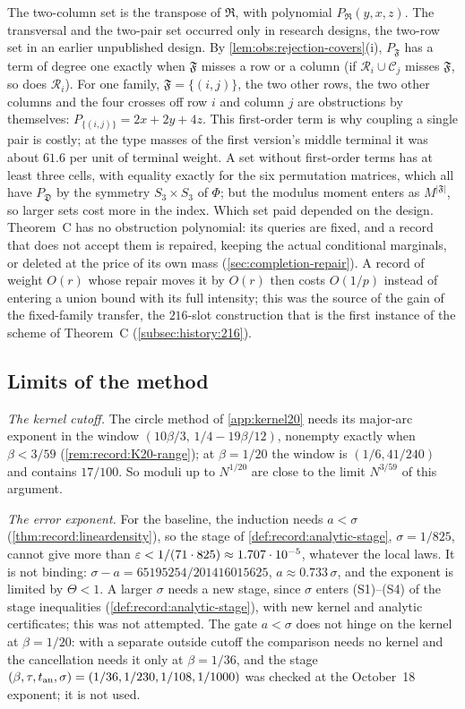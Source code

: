 The two-column set is the transpose of $\mathfrak R$, with polynomial
$P_{\mathfrak R}(y,x,z)$. The transversal and the two-pair set occurred only in
research designs, the two-row set in an earlier unpublished design. By
\cref{lem:obs:rejection-covers}(i), $P_{\mathfrak F}$ has a term of degree one
exactly when $\mathfrak F$ misses a row or a column (if
$\mathcal R_i\cup\mathcal C_j$ misses $\mathfrak F$, so does $\mathcal R_i$). For
one family, $\mathfrak F=\{(i,j)\}$, the two other rows, the two other columns
and the four crosses off row $i$ and column $j$ are obstructions by themselves:
$P_{\{(i,j)\}}=2x+2y+4z$. This first-order term is why coupling a single pair is
costly; at the type masses of the first version's middle terminal it was about
$61.6$ per unit of terminal weight. A set without first-order terms has at least
three cells, with equality exactly for the six permutation matrices, which all
have $P_{\mathfrak D}$ by the symmetry $S_3\times S_3$ of $\Phi$; but the
modulus moment enters as $M^{|\mathfrak F|}$, so larger sets cost more in the
index. Which set paid depended on the design. Theorem~C has no obstruction
polynomial: its queries are fixed, and a record that does not accept them is
repaired, keeping the actual conditional marginals, or deleted at the price of
its own mass (\cref{sec:completion-repair}). A record of weight $O(r)$ whose
repair moves it by $O(r)$ then costs $O(1/p)$ instead of entering a union bound
with its full intensity; this was the source of the gain of the fixed-family
transfer, the $216$-slot construction that is the first instance of the scheme
of Theorem~C (\cref{subsec:history:216}).

\subsection{Limits of the method}\label{subsec:obs:limits}

\emph{The kernel cutoff.} The circle method of \cref{app:kernel20} needs its
major-arc exponent in the window $(10\beta/3,\,1/4-19\beta/12)$, nonempty exactly
when $\beta<3/59$ (\cref{rem:record:K20-range}); at $\beta=1/20$ the window is
$(1/6,41/240)$ and contains $17/100$. So moduli up to $N^{1/20}$ are close to the
limit $N^{3/59}$ of this argument.

\emph{The error exponent.} For the baseline, the induction needs $a<\sigma$
(\cref{thm:record:lineardensity}), so the stage of
\cref{def:record:analytic-stage}, $\sigma=1/825$, cannot give more than
$\varepsilon<1/(71\cdot825)\approx1.707\cdot10^{-5}$, whatever the local laws. It is not
binding: $\sigma-a=65195254/201416015625$, $a\approx0.733\,\sigma$, and the
exponent is limited by $\Theta<1$. A larger $\sigma$ needs a new stage, since $\sigma$ enters (S1)--(S4) of the stage inequalities (\cref{def:record:analytic-stage}), with new kernel and analytic
certificates; this was not attempted. The gate $a<\sigma$ does not hinge on the
kernel at $\beta=1/20$: with a separate outside cutoff the comparison needs no
kernel and the cancellation needs it only at $\beta=1/36$, and the stage
$(\beta,\tau,t_{\rm an},\sigma)=(1/36,1/230,1/108,1/1000)$ was checked at the
October~18 exponent; it is not used.

